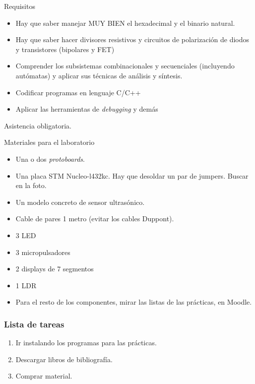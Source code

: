 \documentclass[a4paper]{book}
\begin{document}
Requisitos

\begin{itemize}
	 \item Hay que saber manejar MUY BIEN el hexadecimal y el binario natural.
	 \item Hay que saber hacer divisores resistivos y circuitos de polarización de diodos y transistores (bipolares y FET)
	 \item Comprender los subsistemas combinacionales y secuenciales (incluyendo autómatas) y aplicar sus técnicas de análisis y síntesis.
	 \item Codificar programas en lenguaje C/C++
	 \item Aplicar las herramientas de \textit{debugging} y demás
\end{itemize}

Asistencia obligatoria.

Materiales para el laboratorio
\begin{itemize}
	 \item Una o dos \textit{protoboards}.
	 \item Una placa STM Nucleo-l432kc. Hay que desoldar un par de jumpers. Buscar en la foto.
	 \item Un modelo concreto de sensor ultrasónico.
	 \item Cable de pares 1 metro (evitar los cables Duppont).
	 \item 3 LED
	 \item 3 micropulsadores
	 \item 2 displays de 7 segmentos
	 \item 1 LDR
	 \item Para el resto de los componentes, mirar las listas de las prácticas, en Moodle.
\end{itemize}

\subsubsection{Lista de tareas} \vspace{\parskip}
\begin{enumerate}
	 \item Ir instalando los programas para las prácticas.
	 \item Descargar libros de bibliografía.
	 \item Comprar material.
\end{enumerate}
\newpage

\setlength{\parskip}{0em}
\tableofcontents 
\setlength{\parskip}{0.5em}
\end{document}
